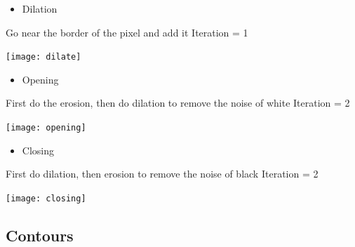 \documentclass{article}
\begin{document}
    \begin{itemize}
        \item Dilation
    \end{itemize}

    Go near the border of the pixel and add it
    Iteration = 1

    \texttt{[image: dilate]}

    \begin{itemize}
        \item Opening
    \end{itemize}

    First do the erosion, then do dilation to remove the noise of white
    Iteration = 2

    \texttt{[image: opening]}

    \begin{itemize}
        \item Closing
    \end{itemize}

    First do dilation, then erosion to remove the noise of black
    Iteration = 2

    \texttt{[image: closing]}

    \subsection{Contours}
\end{document}
